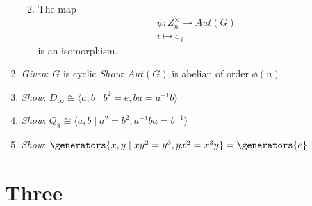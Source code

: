 \begin{enumerate}
  \begin{enumerate}
  \def\labelenumii{\arabic{enumii}.}
  \setcounter{enumii}{5}
  \tightlist
  \item
    The map
    \begin{align*}\psi: Z_n^\times \rightarrow Aut(G)\\ i \mapsto \sigma_i\end{align*}
    is an isomorphism.
  \end{enumerate}
\item
  \emph{Given}: \(G\) is cyclic \emph{Show}: \(Aut(G)\) is abelian of
  order \(\phi(n)\)
\item
  \emph{Show}:
  \(D_\infty \cong \langle a,b \mid b^2 = e, ba = a^{-1} b \rangle\)
\item
  \emph{Show}:
  \(Q_8 \cong \langle a,b \mid a^2 = b^2, a^{-1}ba = b^{-1}\rangle\)
\item
  \emph{Show}:
  \(\generators{x,y \mid xy^2 = y^3, yx^2 = x^3y} = \generators{e}\)
\end{enumerate}

\hypertarget{three}{%
\section{Three}\label{three}}

